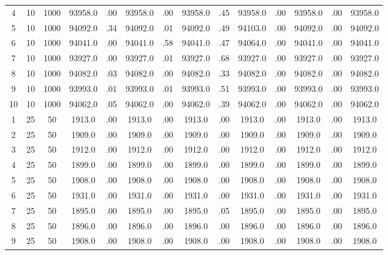 \documentclass[12pt,a4paper]{article}
\begin{document}
\begin{center}
{\begin{tabular}{|ccc|cc|cc|cc|cc|cc|c|}
4             &  10&1000&  93958.0&  .00&  93958.0&  .00&  93958.0&  .45&  93958.0&  .00&  93958.0&  .00&  93958.0\\[-0.01in]
5             &  10&1000&  94092.0&  .34&  94092.0&  .01&  94092.0&  .49&  94103.0&  .00&  94092.0&  .00&  94092.0\\[-0.01in]
6             &  10&1000&  94041.0&  .00&  94041.0&  .58&  94041.0&  .47&  94064.0&  .00&  94041.0&  .00&  94041.0\\[-0.01in]
7             &  10&1000&  93927.0&  .00&  93927.0&  .01&  93927.0&  .68&  93927.0&  .00&  93927.0&  .00&  93927.0\\[-0.01in]
8             &  10&1000&  94082.0&  .03&  94082.0&  .00&  94082.0&  .33&  94082.0&  .00&  94082.0&  .00&  94082.0\\[-0.01in]
9             &  10&1000&  93993.0&  .01&  93993.0&  .01&  93993.0&  .51&  93993.0&  .00&  93993.0&  .00&  93993.0\\[-0.01in]
10            &  10&1000&  94062.0&  .05&  94062.0&  .00&  94062.0&  .39&  94062.0&  .00&  94062.0&  .00&  94062.0\\[-0.01in]
1             &  25&  50&   1913.0&  .00&   1913.0&  .00&   1913.0&  .00&   1913.0&  .00&   1913.0&  .00&   1913.0\\[-0.01in]
2             &  25&  50&   1909.0&  .00&   1909.0&  .00&   1909.0&  .00&   1909.0&  .00&   1909.0&  .00&   1909.0\\[-0.01in]
3             &  25&  50&   1912.0&  .00&   1912.0&  .00&   1912.0&  .00&   1912.0&  .00&   1912.0&  .00&   1912.0\\[-0.01in]
4             &  25&  50&   1899.0&  .00&   1899.0&  .00&   1899.0&  .00&   1899.0&  .00&   1899.0&  .00&   1899.0\\[-0.01in]
5             &  25&  50&   1908.0&  .00&   1908.0&  .00&   1908.0&  .00&   1908.0&  .00&   1908.0&  .00&   1908.0\\[-0.01in]
6             &  25&  50&   1931.0&  .00&   1931.0&  .00&   1931.0&  .00&   1931.0&  .00&   1931.0&  .00&   1931.0\\[-0.01in]
7             &  25&  50&   1895.0&  .00&   1895.0&  .00&   1895.0&  .05&   1895.0&  .00&   1895.0&  .00&   1895.0\\[-0.01in]
8             &  25&  50&   1896.0&  .00&   1896.0&  .00&   1896.0&  .00&   1896.0&  .00&   1896.0&  .00&   1896.0\\[-0.01in]
9             &  25&  50&   1908.0&  .00&   1908.0&  .00&   1908.0&  .00&   1908.0&  .00&   1908.0&  .00&   1908.0\\[-0.01in]

\end{tabular}}
\end{center}
\end{document}
